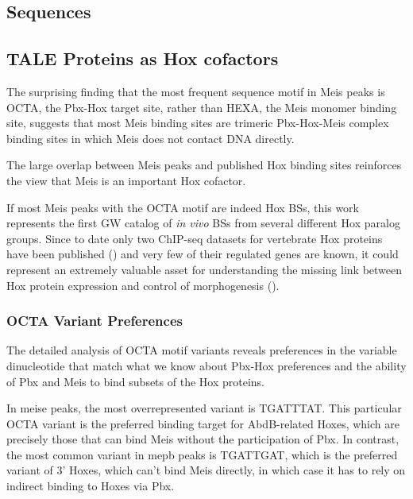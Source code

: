 
\subsection{Sequences}



\subsection{TALE Proteins as Hox cofactors}

The surprising finding that the most frequent sequence motif in Meis peaks is \ac{OCTA}, the Pbx-Hox target site, rather than \ac{HEXA}, the Meis monomer binding site, suggests that most Meis binding sites are trimeric Pbx-Hox-Meis complex binding sites in which Meis does not contact DNA directly. 

The large overlap between Meis peaks and published Hox binding sites reinforces the view that Meis is an important Hox cofactor. 

If most Meis peaks with the \ac{OCTA} motif are indeed Hox \acp{BS}, this work represents the first \ac{GW} catalog of \textit{in vivo} \acp{BS} from several different Hox paralog groups. Since to date only two ChIP-seq datasets for vertebrate Hox proteins have been published (\cite{Jung2010, Donaldson2012}) and very few of their regulated genes are known, it could represent an extremely valuable asset for understanding the missing link between Hox protein expression and control of morphogenesis (\cite{ref}).

\subsubsection{OCTA Variant Preferences}

The detailed analysis of \ac{OCTA} motif variants reveals preferences in the variable dinucleotide that match what we know about Pbx-Hox preferences and the ability of Pbx and Meis to bind subsets of the Hox proteins. 

In \ac{meise} peaks, the most overrepresented variant is TGATTTAT. This particular \ac{OCTA} variant is the preferred binding target for AbdB-related Hoxes, which are precisely those that can bind Meis without the participation of Pbx. In contrast, the most common variant in \ac{mepb} peaks is TGATTGAT, which is the preferred variant of 3' Hoxes, which can't bind Meis directly, in which case it has to rely on indirect binding to Hoxes via Pbx.

